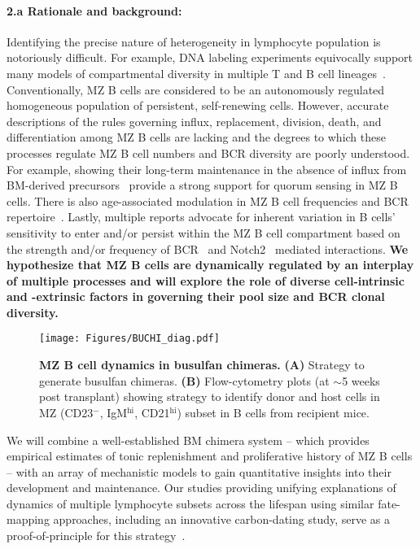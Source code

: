 \documentclass[11pt]{article}
\newcommand{\para}[1]{\vspace*{-4.5mm}\paragraph{#1}}
\begin{document}
\para{{2.a Rationale and background:}}
Identifying the precise nature of heterogeneity in lymphocyte population is notoriously difficult. For example, DNA labeling experiments equivocally support many models of compartmental diversity in multiple  T and B cell lineages~\cite{Asquith_2002, Westera_2013, De_Boer_2013, Bonhoeffer_2000, Ganusov_2010, Ganusov_2013, Schittler_2013}.
Conventionally, MZ B cells are considered to be an autonomously regulated homogeneous population of persistent, self-renewing cells. 
However, accurate descriptions of the rules governing influx, replacement, division, death, and differentiation among MZ B cells are lacking and the degrees to which these processes regulate MZ B cell numbers and BCR diversity are poorly understood. 
For example,  showing their long-term maintenance in the absence of influx from BM-derived precursors~\cite{Carvalho_2001, Hao_2001} provide a strong support for quorum sensing in MZ B cells.   
There is also age-associated modulation in MZ B cell frequencies and BCR repertoire~\cite{Birjandi_2011, Cortegano_2017}.
Lastly, multiple reports advocate for inherent variation in B cells' sensitivity to enter and/or persist within the MZ B cell compartment based on the strength and/or frequency of BCR~\cite{Cariappa_2001, Seo_2001, Samardzic_2002,  Pillai_2005, Martin_2000, Chen_1997} and Notch2~\cite{Tanigaki_2002, Saito_2003, Witt_2003, Hozumi_2004, Hammad_2017, Hampel_2011, Lechner_2021} mediated interactions. %
\textbf{We hypothesize that MZ B cells are dynamically regulated by an interplay of multiple processes and will explore the role of diverse cell-intrinsic and -extrinsic factors in governing their pool size and BCR clonal diversity.
}

\begin{wrapfigure}{r}{0.36\textwidth}
\centering
\vspace*{-6mm}
\texttt{[image: Figures/BUCHI\_diag.pdf]}
\vspace*{-7mm}
\caption{\textbf{MZ B cell dynamics in busulfan chimeras.}
\textbf{(A)} Strategy to generate busulfan chimeras.
\textbf{(B)} Flow-cytometry plots (at $\sim$5 weeks post transplant) showing strategy to identify donor and host cells in MZ (CD23$^-$, IgM$^\text{hi}$, CD21$^\text{hi}$) subset in B cells from recipient mice.%
}
\label{fig:BUCHI}
\vspace*{-9mm}
\end{wrapfigure}
We will combine a well-established BM chimera system -- which provides empirical estimates of tonic replenishment and proliferative history of MZ B cells -- with an array of mechanistic models to gain quantitative insights into their development and maintenance.
Our studies providing unifying explanations of dynamics of multiple lymphocyte subsets across the lifespan using similar fate-mapping approaches, including an innovative carbon-dating study, serve as a proof-of-principle for this strategy~\cite{Rane_2018, Verheijen_2020, Rane_2022, Mold_2019}.
\end{document}
